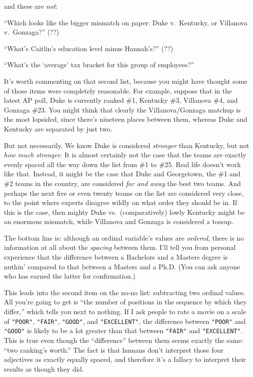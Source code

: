 and these are \textit{not}:

\begin{compactitem}
\item[\leftthumbsdown] ``Which looks like the bigger mismatch on paper: Duke
v.~Kentucky, or Villanova v.~Gonzaga?'' (??)
\item[\leftthumbsdown] ``What's Caitlin's education level minus Hannah's?'' (??)
\item[\leftthumbsdown] ``What's the `average' tax bracket for this group of
employees?''
\end{compactitem}

It's worth commenting on that second list, because you might have thought some
of those items were completely reasonable. For example, suppose that in the
latest AP poll, Duke is currently ranked \#1, Kentucky \#3, Villanova \#4, and
Gonzaga \#23. You might think that clearly the Villanova/Gonzaga matchup is the
most lopsided, since there's nineteen places between them, whereas Duke and
Kentucky are separated by just two.

But not necessarily. We know Duke is considered \textit{stronger} than
Kentucky, but not \textit{how much stronger}. It is almost certainly not the
case that the teams are exactly evenly spaced all the way down the list from
\#1 to \#25. Real life doesn't work like that. Instead, it might be the case
that Duke and Georgetown, the \#1 and \#2 teams in the country, are considered
\textit{far and away} the best two teams. And perhaps the next five or even
twenty teams on the list are considered very close, to the point where experts
disagree wildly on what order they should be in. If this is the case, then
mighty Duke vs.~(comparatively) lowly Kentucky might be an enormous mismatch,
while Villanova and Gonzaga is considered a tossup.

The bottom line is: although an ordinal variable's values are \textit{ordered},
there is no information at all about the \textit{spacing} between them. I'll
tell you from personal experience that the difference between a Bachelors and a
Masters degree is nuthin' compared to that between a Masters and a Ph.D. (You
can ask anyone who has earned the latter for confirmation.)

This leads into the second item on the no-no list: subtracting two ordinal
values. All you're going to get is ``the number of positions in the sequence by
which they differ,'' which tells you next to nothing. If I ask people to rate a
movie on a scale of \texttt{"POOR"}, \texttt{"FAIR"}, \texttt{"GOOD"}, and
\texttt{"EXCELLENT"}, the difference between \texttt{"POOR"} and
\texttt{"GOOD"} is likely to be a lot greater than that between \texttt{"FAIR"}
and \texttt{"EXCELLENT"}. This is true even though the ``difference'' between
them seems exactly the same: ``two ranking's worth.'' The fact is that humans
don't interpret those four adjectives as exactly equally spaced, and therefore
it's a fallacy to interpret their results as though they did.

